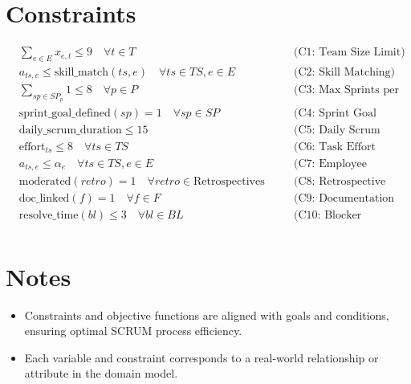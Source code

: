 \documentclass{article}
\begin{document}
\section*{Constraints}
\begin{align*}
& \sum_{e \in E} x_{e,t} \leq 9 \quad \forall t \in T \quad && \text{(C1: Team Size Limit)} \\
& a_{ts,e} \leq \text{skill\_match}(ts,e) \quad \forall ts \in TS, e \in E \quad && \text{(C2: Skill Matching)} \\
& \sum_{sp \in SP_p} 1 \leq 8 \quad \forall p \in P \quad && \text{(C3: Max Sprints per Project)} \\
& \text{sprint\_goal\_defined}(sp) = 1 \quad \forall sp \in SP \quad && \text{(C4: Sprint Goal Alignment)} \\
& \text{daily\_scrum\_duration} \leq 15 \quad && \text{(C5: Daily Scrum Duration Limit)} \\
& \text{effort}_{ts} \leq 8 \quad \forall ts \in TS \quad && \text{(C6: Task Effort Limit)} \\
& a_{ts,e} \leq \alpha_e \quad \forall ts \in TS, e \in E \quad && \text{(C7: Employee Availability)} \\
& \text{moderated}(retro) = 1 \quad \forall retro \in \text{Retrospectives} \quad && \text{(C8: Retrospective Moderation)} \\
& \text{doc\_linked}(f) = 1 \quad \forall f \in F \quad && \text{(C9: Documentation Completeness)} \\
& \text{resolve\_time}(bl) \leq 3 \quad \forall bl \in BL \quad && \text{(C10: Blocker Resolution Time)} \\
\end{align*}

\section*{Notes}
\begin{itemize}
  \item Constraints and objective functions are aligned with goals and conditions, ensuring optimal SCRUM process efficiency.
  \item Each variable and constraint corresponds to a real-world relationship or attribute in the domain model.
\end{itemize}
\end{document}
